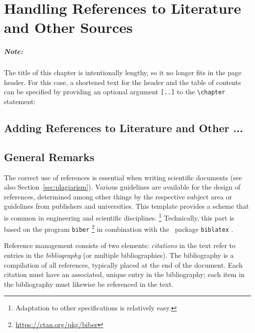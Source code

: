 \chapter[References to Literature]{Handling References to Literature and Other Sources}
\label{cha:Literature}

\paragraph{Note:} The title of this chapter is intentionally lengthy, so it no
longer fits in the page header. For this case, a shortened text for the header
and the table of contents can be specified by providing an
optional argument \verb![..]! to the \verb!\chapter! statement:
%
\begin{LaTeXCode}[numbers=none]
\chapter[References to Literature]{Adding References to Literature and Other ...}
\end{LaTeXCode}


\section{General Remarks}

The correct use of references is essential when writing scientific documents
(see also Section~\ref{sec:plagiarism}). Various guidelines are available for
the design of references, determined among other things by the respective 
subject area or guidelines from publishers and universities. 
This template provides a scheme that is common in engineering and scientific
disciplines.%
\footnote{Adaptation to other specifications is relatively easy.}
Technically, this part is based on the program \texttt{biber}%
\footnote{\url{https://ctan.org/pkg/biber}}
in combination with the \latex\ package \texttt{biblatex} \cite{Kime2024}.

Reference management consists of two elements: \emph{citations} in the text
refer to entries in the \emph{bibliography} (or multiple bibliographies). The
bibliography is a compilation of all references, typically placed at the end of
the document. Each citation must have an associated, unique entry in the
bibliography; each item in the bibliography must likewise be referenced in the
text.


